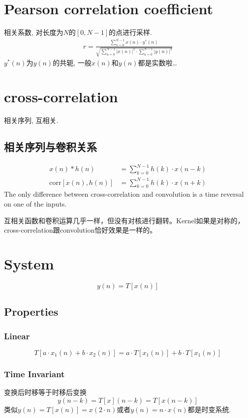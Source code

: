 \documentclass[a4paper]{report}
\begin{document}
\section{Pearson correlation coefficient}
相关系数, 对长度为$N$的$[0,N-1]$的点进行采样. 
\begin{align*}
  r=\frac{\displaystyle\sum_{n=0}^{N-1}x(n)\cdot y^*(n)}{\sqrt{\displaystyle\sum_{n=0}^{N-1}\lvert x(n)\rvert^2\cdot  \displaystyle\sum_{n=0}^{N-1}\lvert y(n)\rvert^2}}
\end{align*}
$y^*(n)$为$y(n)$的共轭, 一般$x(n)$和$y(n)$都是实数啦\dots
\section{cross-correlation}
相关序列, 互相关. 
\subsection{相关序列与卷积关系}

\begin{align*}
  x(n)* h(n)&=\displaystyle\sum_{k=0}^{N-1} h(k)\cdot x(n-k)
  \\ \text{corr}[x(n),h(n)]&=\displaystyle\sum_{k=0}^{N-1} h(k)\cdot x(n+k)
\end{align*}
The only difference between cross-correlation and convolution is a time reversal on one of the inputs. 

互相关函数和卷积运算几乎一样，但没有对核进行翻转。Kernel如果是对称的，cross-correlation跟convolution恰好效果是一样的。

\section{System}
\begin{equation}
  y(n)=T[x(n)]
\end{equation}
\subsection{Properties}
\subsubsection{Linear}
\begin{equation}
  T[a\cdot x_1(n)+b\cdot x_2(n)]=a\cdot T[x_1(n)]+b\cdot T[x_1(n)]
\end{equation}
\subsubsection{Time Invariant}
变换后时移等于时移后变换
\begin{equation}
  y(n-k)=T[x](n-k)=T[x(n-k)]
\end{equation}
类似$y(n)=T[x(n)]=x(2\cdot n)$或者$y(n)=n\cdot x(n)$都是时变系统. 
\end{document}
